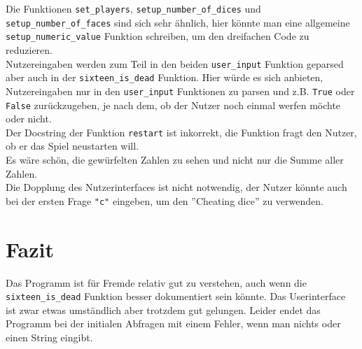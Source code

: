 Die Funktionen \verb+set_players+, \verb+setup_number_of_dices+ und \verb+setup_number_of_faces+ sind sich sehr ähnlich, hier könnte man eine allgemeine \verb+setup_numeric_value+ Funktion schreiben, um den dreifachen Code zu reduzieren.\\

Nutzereingaben werden zum Teil in den beiden \verb+user_input+ Funktion geparsed aber auch in der \verb+sixteen_is_dead+ Funktion. Hier würde es sich anbieten, Nutzereingaben nur in den \verb+user_input+ Funktionen zu parsen und z.B. \verb+True+ oder \verb+False+ zurückzugeben, je nach dem, ob der Nutzer noch einmal werfen möchte oder nicht.\\

Der Docstring der Funktion \verb+restart+ ist inkorrekt, die Funktion fragt den Nutzer, ob er das Spiel neustarten will.\\

Es wäre schön, die gewürfelten Zahlen zu sehen und nicht nur die Summe aller Zahlen.\\

Die Dopplung des Nutzerinterfaces ist nicht notwendig, der Nutzer könnte auch bei der ersten Frage \verb+"c"+ eingeben, um den ''Cheating dice'' zu verwenden.\\

\section*{Fazit}
Das Programm ist für Fremde relativ gut zu verstehen, auch wenn die \verb+sixteen_is_dead+ Funktion besser dokumentiert sein könnte.
Das Userinterface ist zwar etwas umständlich aber trotzdem gut gelungen. Leider endet das Programm bei der initialen Abfragen mit einem Fehler, wenn man nichts oder einen String eingibt.